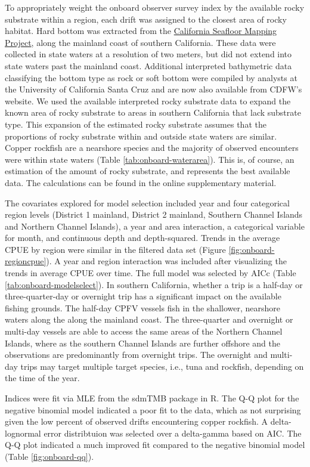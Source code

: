 \documentclass[11pt,
  english,
  letterpaper,
]{article}
\begin{document}
To appropriately weight the onboard observer survey index by the available rocky substrate within a region, each drift was assigned to the closest area of rocky habitat. Hard bottom was extracted from the \href{http://seafloor.otterlabs.org/index.html}{California Seafloor Mapping Project}, along the mainland coast of southern California. These data were collected in state waters at a resolution of two meters, but did not extend into state waters past the mainland coast. Additional interpreted bathymetric data classifying the bottom type as rock or soft bottom were compiled by analysts at the University of California Santa Cruz and are now also available from CDFW's website. We used the available interpreted rocky substrate data to expand the known area of rocky substrate to areas in southern California that lack substrate type. This expansion of the estimated rocky substrate assumes that the proportions of rocky substrate within and outside state waters are similar. Copper rockfish are a nearshore species and the majority of observed encounters were within state waters (Table \ref{tab:onboard-waterarea}). This is, of course, an estimation of the amount of rocky substrate, and represents the best available data. The calculations can be found in the online supplementary material.

The covariates explored for model selection included year and four categorical region levels (District 1 mainland, District 2 mainland, Southern Channel Islands and Northern Channel Islands), a year and area interaction, a categorical variable for month, and continuous depth and depth-squared. Trends in the average CPUE by region were similar in the filtered data set (Figure \ref{fig:onboard-regioncpue}). A year and region interaction was included after visualizing the trends in average CPUE over time. The full model was selected by AICc (Table \ref{tab:onboard-modelselect}). In southern California, whether a trip is a half-day or three-quarter-day or overnight trip has a significant impact on the available fishing grounds. The half-day CPFV vessels fish in the shallower, nearshore waters along the along the mainland coast. The three-quarter and overnight or multi-day vessels are able to access the same areas of the Northern Channel Islands, where as the southern Channel Islands are further offshore and the observations are predominantly from overnight trips. The overnight and multi-day trips may target multiple target species, i.e., tuna and rockfish, depending on the time of the year.

Indices were fit via MLE from the sdmTMB package in R. The Q-Q plot for the negative binomial model indicated a poor fit to the data, which as not surprising given the low percent of observed drifts encountering copper rockfish. A delta-lognormal error distribtuion was selected over a delta-gamma based on AIC. The Q-Q plot indicated a much improved fit compared to the negative binomial model (Table \ref{fig:onboard-qq}).
\end{document}
